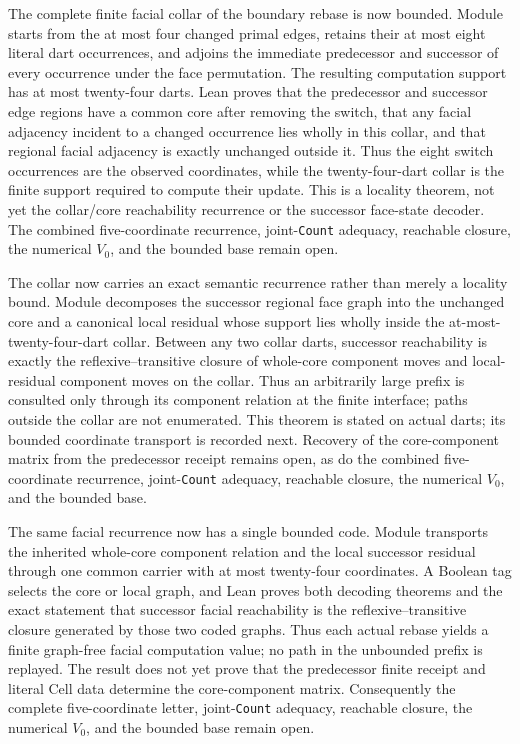 \documentclass[11pt]{article}
\theoremstyle{definition}
\begin{document}
The complete finite facial collar of the boundary rebase is now bounded.
Module
starts from the at most four changed primal edges, retains their at most eight
literal dart occurrences, and adjoins the immediate predecessor and successor
of every occurrence under the face permutation.  The resulting computation
support has at most twenty-four darts.  Lean proves that the predecessor and
successor edge regions have a common core after removing the switch, that any
facial adjacency incident to a changed occurrence lies wholly in this collar,
and that regional facial adjacency is exactly unchanged outside it.  Thus the
eight switch occurrences are the observed coordinates, while the
twenty-four-dart collar is the finite support required to compute their update.
This is a locality theorem, not yet the collar/core reachability recurrence or
the successor face-state decoder.  The combined five-coordinate recurrence,
joint-\texttt{Count} adequacy, reachable closure, the numerical $V_0$, and the
bounded base remain open.

The collar now carries an exact semantic recurrence rather than merely a
locality bound.  Module
decomposes the successor regional face graph into the unchanged core and a
canonical local residual whose support lies wholly inside the at-most-
twenty-four-dart collar.  Between any two collar darts, successor reachability
is exactly the reflexive--transitive closure of whole-core component moves and
local-residual component moves on the collar.  Thus an arbitrarily large
prefix is consulted only through its component relation at the finite
interface; paths outside the collar are not enumerated.  This theorem is
stated on actual darts; its bounded coordinate transport is recorded next.
Recovery of the core-component matrix from the predecessor receipt remains
open, as do the combined five-coordinate recurrence, joint-\texttt{Count}
adequacy, reachable closure, the numerical $V_0$, and the bounded base.

The same facial recurrence now has a single bounded code.  Module
transports the inherited whole-core component relation and the local successor
residual through one common carrier with at most twenty-four coordinates.  A
Boolean tag selects the core or local graph, and Lean proves both decoding
theorems and the exact statement that successor facial reachability is the
reflexive--transitive closure generated by those two coded graphs.  Thus each
actual rebase yields a finite graph-free facial computation value; no path in
the unbounded prefix is replayed.  The result does not yet prove that the
predecessor finite receipt and literal Cell data determine the core-component
matrix.  Consequently the complete five-coordinate letter,
joint-\texttt{Count} adequacy, reachable closure, the numerical $V_0$, and the
bounded base remain open.
\end{document}
